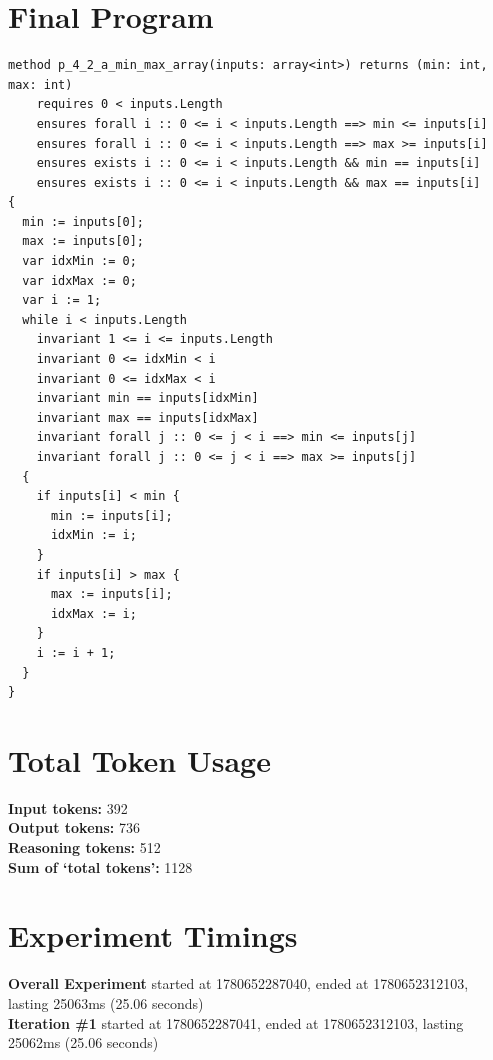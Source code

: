 \documentclass{article}
\begin{document}
\section*{Final Program}
\begin{lstlisting}
method p_4_2_a_min_max_array(inputs: array<int>) returns (min: int, max: int)
	requires 0 < inputs.Length
	ensures forall i :: 0 <= i < inputs.Length ==> min <= inputs[i]
	ensures forall i :: 0 <= i < inputs.Length ==> max >= inputs[i]
	ensures exists i :: 0 <= i < inputs.Length && min == inputs[i]
	ensures exists i :: 0 <= i < inputs.Length && max == inputs[i]
{
  min := inputs[0];
  max := inputs[0];
  var idxMin := 0;
  var idxMax := 0;
  var i := 1;
  while i < inputs.Length
    invariant 1 <= i <= inputs.Length
    invariant 0 <= idxMin < i
    invariant 0 <= idxMax < i
    invariant min == inputs[idxMin]
    invariant max == inputs[idxMax]
    invariant forall j :: 0 <= j < i ==> min <= inputs[j]
    invariant forall j :: 0 <= j < i ==> max >= inputs[j]
  {
    if inputs[i] < min {
      min := inputs[i];
      idxMin := i;
    }
    if inputs[i] > max {
      max := inputs[i];
      idxMax := i;
    }
    i := i + 1;
  }
}
\end{lstlisting}
\section*{Total Token Usage}
\textbf{Input tokens: }392
\\\textbf{Output tokens: }736
\\\textbf{Reasoning tokens: }512
\\\textbf{Sum of `total tokens': }1128
\section*{Experiment Timings}
\textbf{Overall Experiment} started at 1780652287040, ended at 1780652312103, lasting 25063ms (25.06 seconds)
\\\textbf{Iteration \#1} started at 1780652287041, ended at 1780652312103, lasting 25062ms (25.06 seconds)
\end{document}
